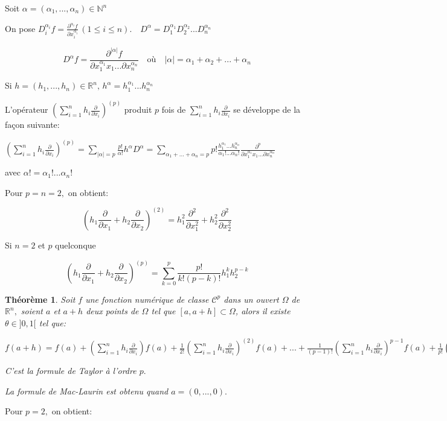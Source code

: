 \documentclass[11pt,a4paper]{report}
\newtheorem{theorem}{Théorème}[section]
\begin{document}
Soit $\alpha=(\alpha_1,...,\alpha_n)\in \mathbb{N}^n$

On pose $D_{i}^{\alpha_i}f=\frac{\partial^{\alpha_i}f}{\partial x_{i}^{\alpha_i}}\,(1\leq i\leq n).\quad D^{\alpha}=D_{1}^{\alpha_1}D_{2}^{\alpha_2}...D_{n}^{\alpha_n}$

$$D^{\alpha}f=\frac{\partial^{|\alpha|}f}{\partial x_{1}^{\alpha_1}x_1...\partial x_{n}^{\alpha_n}}\quad\mbox{où}\quad |\alpha|=\alpha_1+\alpha_2+...+\alpha_n$$

Si $h=(h_1,...,h_n)\in \mathbb{R}^n,\,h^{\alpha}=h_{1}^{\alpha_1}...h_{n}^{\alpha_n}$

L'opérateur $(\sum\limits_{i=1}^{n}h_i\frac{\partial}{\partial x_i})^{(p)}$ produit $p$ fois de $\sum\limits_{i=1}^{n}h_i\frac{\partial}{\partial x_i}$ se développe de la façon suivante:

$(\sum\limits_{i=1}^{n}h_i\frac{\partial}{\partial x_i})^{(p)}=\sum\limits_{|\alpha|=p}\frac{p!}{\alpha!}h^{\alpha}D^{\alpha}=\sum\limits_{\alpha_1+...+\alpha_n=p}p!\frac{h_{1}^{\alpha_1}...h_{n}^{\alpha_n}}{\alpha_1 !...\alpha_n !}\frac{\partial^p}{\partial x_{1}^{\alpha_1}x_1...\partial x_{n}^{\alpha_n}}$

avec $\alpha!=\alpha_{1}!...\alpha_{n}!$

Pour $p=n=2,$ on obtient:

$$(h_1\frac{\partial}{\partial x_1}+h_2\frac{\partial}{\partial x_2})^{(2)}=h_{1}^{2}\frac{\partial^2}{\partial x_{1}^{2}}+h_{2}^{2}\frac{\partial^2}{\partial x_{2}^{2}}$$

Si $n=2$ et $p$ quelconque

$$(h_1\frac{\partial}{\partial x_1}+h_2\frac{\partial}{\partial x_2})^{(p)}=\sum\limits_{k=0}^{p}\frac{p!}{k!(p-k)!}h_{1}^{k}h_{2}^{p-k}$$
\begin{theorem}
Soit $f$ une fonction numérique de classe $\mathscr{C}^p$ dans un ouvert $\Omega$ de $\mathbb{R}^n,$ soient $a$ et $a+h$ deux points de $\Omega$ tel que $[a,a+h]\subset\Omega$, alors il existe $\theta\in ]0,1[$ tel que:

$f(a+h)=f(a)+(\sum\limits_{i=1}^{n}h_i\frac{\partial}{\partial x_i})f(a)+\frac{1}{2!}(\sum\limits_{i=1}^{n}h_i\frac{\partial}{\partial x_i})^{(2)}f(a)+...+\frac{1}{(p-1)!}(\sum\limits_{i=1}^{n}h_i\frac{\partial}{\partial x_i})^{p-1}f(a)+\frac{1}{p!}(\sum\limits_{i=1}^{n}h_i\frac{\partial}{\partial x_i})^{(p)}f(a+\theta h)$

C'est la formule de Taylor à l'ordre $p.$

La formule de Mac-Laurin est obtenu quand $a=(0,...,0).$
\end{theorem}
Pour $p=2,$ on obtient:
\end{document}
